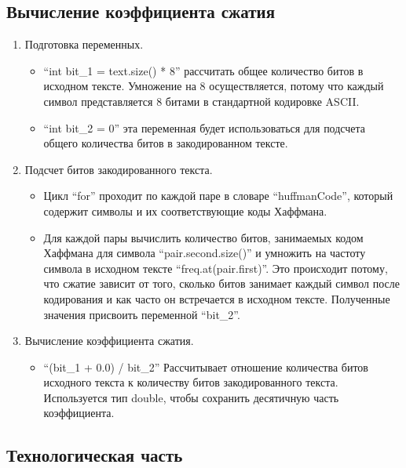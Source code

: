 \documentclass[12pt, a4paper]{article}
\begin{document}
\subsection{Вычисление коэффициента сжатия}
\begin{enumerate}
    \item Подготовка переменных.
    \begin{itemize}
        \item[---] ``int bit\_1 = text.size() * 8'' рассчитать общее количество битов в исходном тексте. Умножение на 8 осуществляется, потому что каждый символ представляется 8 битами в стандартной кодировке ASCII.
        \item[---] ``int bit\_2 = 0'' эта переменная будет использоваться для подсчета общего количества битов в закодированном тексте.
    \end{itemize}
    \item Подсчет битов закодированного текста.
    \begin{itemize}
        \item[---] Цикл ``for'' проходит по каждой паре в словаре ``huffmanCode'', который содержит символы и их соответствующие коды Хаффмана.
        \item[---] Для каждой пары вычислить количество битов, занимаемых кодом Хаффмана для символа ``pair.second.size()'' и умножить на частоту символа в исходном тексте ``freq.at(pair.first)''. Это происходит потому, что сжатие зависит от того, сколько битов занимает каждый символ после кодирования и как часто он встречается в исходном тексте. Полученные значения присвоить переменной ``bit\_2''.
    \end{itemize}
    \item Вычисление коэффициента сжатия.
    \begin{itemize}
        \item[---] ``(bit\_1 + 0.0) / bit\_2'' Рассчитывает отношение количества битов исходного текста к количеству битов закодированного текста. Используется тип double, чтобы сохранить десятичную часть коэффициента.
    \end{itemize}
\end{enumerate}

\newpage
\begin{center}
    \section{Технологическая часть}
\end{center}
\end{document}
